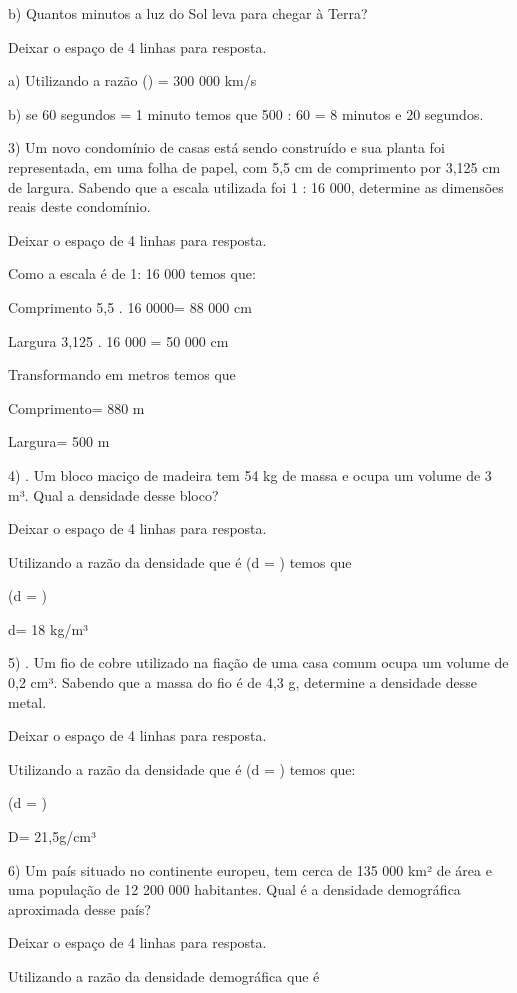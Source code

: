 b) Quantos minutos a luz do Sol leva para chegar à Terra?

Deixar o espaço de 4 linhas para resposta.

a) Utilizando a razão 
() = 300 000 km/s

b) se 60 segundos = 1 minuto temos que 500 : 60 = 8 minutos e 20
segundos.

3) Um novo condomínio de casas está sendo construído e sua planta foi
representada, em uma folha de papel, com 5,5 cm de comprimento por 3,125
cm de largura. Sabendo que a escala utilizada foi 1 : 16 000, determine
as dimensões reais deste condomínio.

Deixar o espaço de 4 linhas para resposta.

Como a escala é de 1: 16 000 temos que:

Comprimento 5,5 . 16 0000= 88 000 cm

Largura 3,125 . 16 000 = 50 000 cm

Transformando em metros temos que

Comprimento= 880 m

Largura= 500 m

4) . Um bloco maciço de madeira tem 54 kg de massa e ocupa um volume de
3 m³. Qual a densidade desse bloco?

Deixar o espaço de 4 linhas para resposta.

Utilizando a razão da densidade que é (d = ) temos que

(d = )

d= 18 kg/m³

5) . Um fio de cobre utilizado na fiação de uma casa comum ocupa um
volume de 0,2 cm³. Sabendo que a massa do fio é de 4,3 g, determine a
densidade desse metal.

Deixar o espaço de 4 linhas para resposta.

Utilizando a razão da densidade que é (d = ) temos que:

(d = )

D= 21,5g/cm³

6) Um país situado no continente europeu, tem cerca de 135 000 km² de
área e uma população de 12 200 000 habitantes. Qual é a densidade
demográfica aproximada desse país?

Deixar o espaço de 4 linhas para resposta.

Utilizando a razão da densidade demográfica que é

